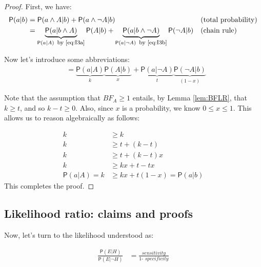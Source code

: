 \documentclass[
  10pt,
  dvipsnames,enabledeprecatedfontcommands]{scrartcl}
\newcommand{\n}{\neg}
\newcommand{\et}{\wedge}
\newcommand{\pr}[1]{\ensuremath{\mathsf{P}(#1)}}
\begin{document}
\begin{proof}

First, we have:
\begin{align*}
\pr{a \vert b} & = \pr{a \et A \vert b} + \pr{a \et \n A \vert b} & &   (\mbox{total probability}) \\
& = \underbrace{\pr{a \vert b \et A}}_{\pr{a \vert A}  \mbox{\footnotesize \, by \eqref{eq:I3a}}} \pr{A \vert b} +
\underbrace{\pr{a \vert b \et \n A}}_{\pr{a \vert \n A} \mbox{\footnotesize \, by \eqref{eq:I3b}}}\pr{\n A \vert b}  & &   (\mbox{chain rule}) \\
\end{align*}

Now let's introduce some abbreviations:
\begin{align*}
& = \underbrace{\pr{a\vert A}}_k \underbrace{\pr{A \vert b}}_x + \underbrace{\pr{a \vert \n A}}_t \underbrace{\pr{\n A \vert b}}_{(1- x)}
\end{align*}

\noindent Note that the assumption that $BF_A\geq 1$ entails, by Lemma \ref{lem:BFLR}, that $k \geq t$, and so $k-t \geq 0$. Also, since $x$ is a probability, we know $0 \leq x \leq 1$. This allows us to reason algebraically as follows:

\begin{align*}
k & \geq k  \\
k & \geq t + (k - t) \\
k & \geq t + (k -t)x \\
k & \geq kx + t  - tx \\
\pr{a \vert A} = k & \geq kx + t(1-x) = \pr{a \vert b}
\end{align*}
\noindent This completes the proof. 
\end{proof}

\hypertarget{likelihood-ratio-claims-and-proofs}{%
\subsection*{Likelihood ratio: claims and
proofs}\label{likelihood-ratio-claims-and-proofs}}

Now, let's turn to the likelihood understood as:

\begin{align*}
\frac{\pr{E \vert H}}{\pr{E \vert \neg H}} & =
\frac{\textit{sensitivity}}{\textit{1- specificity}}\end{align*}
\end{document}
